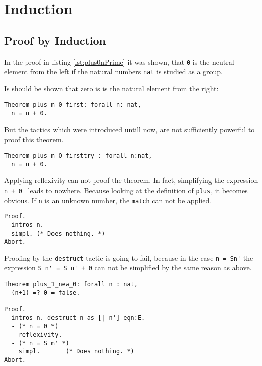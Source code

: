 \section{Induction}

\subsection{Proof by Induction}
In the proof in listing \ref{lst:plus0nPrime} it was shown, 
that \lstinline!0! is the neutral element from the left if the natural numbers \lstinline!nat! is studied as a group. 

Is should be shown that zero is is the natural element from the right:
\begin{lstlisting}[caption = \lstinline!plus_n_0_first!, label= lst:plus_n_0_first]
Theorem plus_n_0_first: forall n: nat,
  n = n + 0.  
\end{lstlisting}

But the tactics which were introduced untill now, are not sufficiently powerful to proof this theorem.

\begin{lstlisting}[caption = \lstinline!plus_n_O_firsttry!, label=lst:plus_n_0_firsttry] 
Theorem plus_n_O_firsttry : forall n:nat,
  n = n + 0.
\end{lstlisting}

Applying reflexivity can not proof the theorem. In fact, simplifying the expression \lstinline!n + 0 ! leads to nowhere.
Because looking at the definition of \lstinline!plus!, it becomes obvious.
If \lstinline!n! is an unknown number, the \lstinline!match! can not be applied.
  
\begin{lstlisting}[caption= \lstinline!Proof! of \lstinline!plus_n_0_firsttry!, label = lst:proof_of_plus_n_0_firsttry]
Proof.
  intros n.
  simpl. (* Does nothing. *)
Abort.
\end{lstlisting}

Proofing by the \lstinline!destruct!-tactic is going to fail, because in the case \lstinline!n = Sn'! the expression \lstinline!S n' = S n' + 0! can not be simplified by the same reason as above.
\begin{lstlisting}[caption = \lstinline!plus_1_new_0!, label = lst:Theorem_plus_1_new_0]
Theorem plus_1_new_0: forall n : nat,
  (n+1) =? 0 = false. 
 
Proof.
  intros n. destruct n as [| n'] eqn:E.
  - (* n = 0 *)
    reflexivity. 
  - (* n = S n' *)
    simpl.       (* Does nothing. *)
Abort.
\end{lstlisting}

